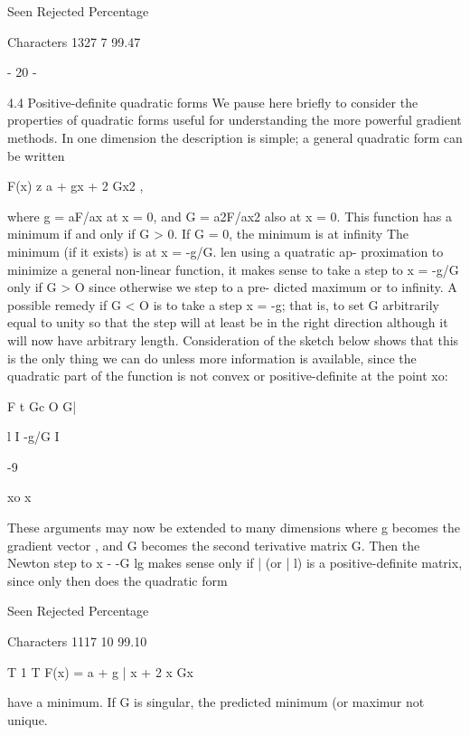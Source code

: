                  Seen Rejected  Percentage
 
Characters       1327        7   99.47
 
                                 - 20 -
 
 
4.4  Positive-definite quadratic forms
     We pause here briefly to consider the properties of quadratic forms
useful for understanding the more powerful gradient methods.  In one
dimension the description is simple;  a general quadratic form can be
written
 
                         F(x) z a + gx + 2 Gx2 ,
 
 
where g = aF/ax at x = 0, and G = a2F/ax2 also at x = 0.  This function
has a minimum if and only if G > 0.  If G = 0, the minimum is at infinity
The minimum (if it exists) is at x = -g/G.  len using a quatratic ap-
proximation to minimize a general non-linear function, it makes sense to
take a step to x = -g/G only if G > O since otherwise we step to a pre-
dicted maximum or to infinity.  A possible remedy if G < O is to take a
step x = -g;  that is, to set G arbitrarily equal to unity so that the
step will at least be in the right direction although it will now have
arbitrary length.  Consideration of the sketch below shows that this is
the only thing we can do unless more information is available, since the
quadratic part of the function is not convex or positive-definite at
the point xo:
 
 
 
          F t Gc O   G|
 
 
                  l  I
                      -g/G   I   \
 
                         -9 \
 
 
 
                       xo                       x
 
 
 
     These arguments may now be extended to many dimensions where g
becomes the gradient vector , and G becomes the second terivative matrix
G.  Then the Newton step to x - -G lg makes sense only if | (or | l) is
a positive-definite matrix, since only then does the quadratic form
 
                 Seen Rejected  Percentage
 
Characters       1117       10   99.10
 
 
                                   T      1  T
                        F(x) = a + g | x + 2 x Gx
 
 
have a minimum.  If G is singular, the predicted minimum (or maximur
not unique.
 
